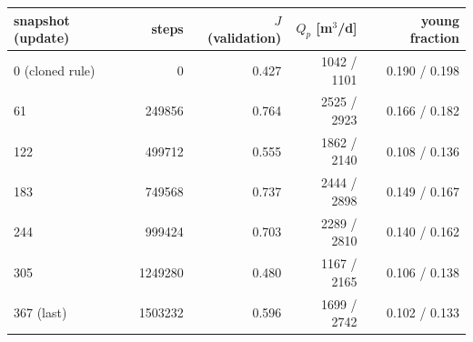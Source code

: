 \begin{tabular}{lrrrr}
\toprule
snapshot (update) & steps & $J$ (validation) & $Q_p$ [m$^3$/d] & young fraction \\
\midrule
0 (cloned rule) & 0 & 0.427 & 1042 / 1101 & 0.190 / 0.198 \\
61 & 249856 & 0.764 & 2525 / 2923 & 0.166 / 0.182 \\
122 & 499712 & 0.555 & 1862 / 2140 & 0.108 / 0.136 \\
183 & 749568 & 0.737 & 2444 / 2898 & 0.149 / 0.167 \\
244 & 999424 & 0.703 & 2289 / 2810 & 0.140 / 0.162 \\
305 & 1249280 & 0.480 & 1167 / 2165 & 0.106 / 0.138 \\
367 (last) & 1503232 & 0.596 & 1699 / 2742 & 0.102 / 0.133 \\
\bottomrule
\end{tabular}
